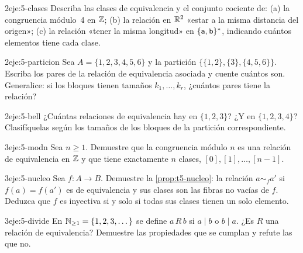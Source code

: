 \begin{ejercicio}{2}{eje:5-clases}
Describa las clases de equivalencia y el conjunto cociente de: (a) la congruencia módulo~4 en $\mathbb{Z}$; (b) la relación en $\mathbb{R}^{2}$ «estar a la misma distancia del origen»; (c) la relación «tener la misma longitud» en $\{\texttt{a},\texttt{b}\}^{*}$, indicando cuántos elementos tiene cada clase.
\end{ejercicio}

\begin{ejercicio}{2}{eje:5-particion}
Sea $A=\{1,2,3,4,5,6\}$ y la partición $\{\{1,2\},\{3\},\{4,5,6\}\}$. Escriba los pares de la relación de equivalencia asociada y cuente cuántos son. Generalice: si los bloques tienen tamaños $k_1,\dots,k_r$, ¿cuántos pares tiene la relación?
\end{ejercicio}

\begin{ejercicio}{2}{eje:5-bell}
¿Cuántas relaciones de equivalencia hay en $\{1,2,3\}$? ¿Y en $\{1,2,3,4\}$? Clasifíquelas según los tamaños de los bloques de la partición correspondiente.
\end{ejercicio}

\begin{ejercicio}{3}{eje:5-modn}
Sea $n\ge1$. Demuestre que la congruencia módulo $n$ es una relación de equivalencia en $\mathbb{Z}$ y que tiene exactamente $n$ clases, $[0],[1],\dots,[n-1]$.
\end{ejercicio}

\begin{ejercicio}{3}{eje:5-nucleo}
Sea $f\colon A\to B$. Demuestre la \cref{prop:t5-nucleo}: la relación $a\sim_f a'$ si $f(a)=f(a')$ es de equivalencia y sus clases son las fibras no vacías de $f$. Deduzca que $f$ es inyectiva si y solo si todas sus clases tienen un solo elemento.
\end{ejercicio}

\begin{ejercicio}{3}{eje:5-divide}
En $\mathbb{N}_{\ge1}=\{1,2,3,\dots\}$ se define $a\,R\,b$ si $a\mid b$ o $b\mid a$. ¿Es $R$ una relación de equivalencia? Demuestre las propiedades que se cumplan y refute las que no.
\end{ejercicio}

